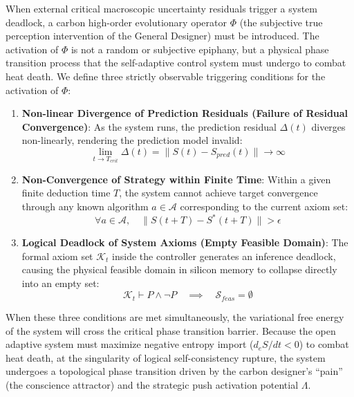 \documentclass{article}
\begin{document}
When external critical macroscopic uncertainty residuals trigger a system deadlock, a carbon high-order evolutionary operator $\Phi$ (the subjective true perception intervention of the General Designer) must be introduced. The activation of $\Phi$ is not a random or subjective epiphany, but a physical phase transition process that the self-adaptive control system must undergo to combat heat death. We define three strictly observable triggering conditions for the activation of $\Phi$:
\begin{enumerate}
    \item \textbf{Non-linear Divergence of Prediction Residuals (Failure of Residual Convergence)}:
    As the system runs, the prediction residual $\Delta(t)$ diverges non-linearly, rendering the prediction model invalid:
    \begin{equation}
        \lim_{t \to T_{crit}} \Delta(t) = \|S(t) - S_{pred}(t)\| \to \infty
    \end{equation}
    \item \textbf{Non-Convergence of Strategy within Finite Time}:
    Within a given finite deduction time $T$, the system cannot achieve target convergence through any known algorithm $a \in \mathcal{A}$ corresponding to the current axiom set:
    \begin{equation}
        \forall a \in \mathcal{A}, \quad \|S(t+T) - S^*(t+T)\| > \epsilon
    \end{equation}
    \item \textbf{Logical Deadlock of System Axioms (Empty Feasible Domain)}:
    The formal axiom set $\mathcal{K}_t$ inside the controller generates an inference deadlock, causing the physical feasible domain in silicon memory to collapse directly into an empty set:
    \begin{equation}
        \mathcal{K}_t \vdash P \wedge \neg P \quad \implies \quad \mathcal{S}_{feas} = \emptyset
    \end{equation}
\end{enumerate}

When these three conditions are met simultaneously, the variational free energy of the system will cross the critical phase transition barrier. Because the open adaptive system must maximize negative entropy import ($d_eS/dt < 0$) to combat heat death, at the singularity of logical self-consistency rupture, the system undergoes a topological phase transition driven by the carbon designer's ``pain'' (the conscience attractor) and the strategic push activation potential $\Lambda$.
\end{document}
